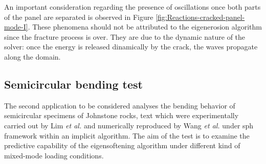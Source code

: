 \documentclass[preprint,12pt,a4paper]{elsarticle}
\begin{document}
An important consideration regarding the presence of oscillations once
both parts of the panel are separated is observed in Figure
\ref{fig:Reactions-cracked-panel-mode-I}. These phenomena should not be
attributed to the eigenerosion algorithm since the fracture process is
over. They are due to the dynamic nature of the solver: once the
energy is released dinamically by the crack, the waves propagate
along the domain.


\subsection{Semicircular bending test}
\label{sec:3.2}

The second application to be considered analyses the bending behavior of semicircular specimens of Johnstone rocks, text which were experimentally carried out by Lim {\it et
  al.} \cite{LIM_1993} and numerically reproduced by Wang {\it et
  al.}\cite{Wang_2020} under \acrshort{sph} framework within an
implicit algorithm. The aim of the test is to examine the predictive
capability of the eigensoftening algorithm under different kind of
mixed-mode loading conditions.
\end{document}
